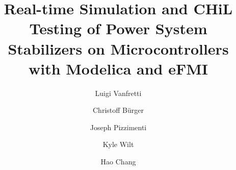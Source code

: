 \documentclass{modelica}
\begin{document}
\thispagestyle{empty}

\title{Real-time Simulation and CHiL Testing of Power System Stabilizers on Microcontrollers with Modelica and eFMI}
\author[1]{Luigi Vanfretti}
\author[2]{Christoff Bürger}
\author[1]{Joseph Pizzimenti}
\author[1]{Kyle Wilt}
\author[1]{Hao Chang}

\maketitle\thispagestyle{empty} %

\newcommand{\myitemsep}{\itemsep-0.1em}
\newcommand{\regtm}{\textsuperscript{\textregistered}}
\newcommand{\controller}{\textcolor{mygreen}{\textbf{\underline{controller}}}}
\newcommand{\plant}{\textcolor{myblue}{\textbf{\underline{plant}}}}
\newcommand{\generatorunit}{\textcolor{mygray}{\textbf{\underline{generator unit}}}}
\newcommand{\squishlist}{
 \begin{list}{$\bullet$}
  { \setlength{\itemsep}{0pt}
     \setlength{\parsep}{3pt}
     \setlength{\topsep}{3pt}
     \setlength{\partopsep}{0pt}
     \setlength{\leftmargin}{1.5em}
     \setlength{\labelwidth}{1em}
     \setlength{\labelsep}{0.5em} } }
\newcommand{\squishlisttwo}{
 \begin{list}{$\bullet$}
  { \setlength{\itemsep}{0pt}
    \setlength{\parsep}{0pt}
    \setlength{	opsep}{0pt}
    \setlength{\partopsep}{0pt}
    \setlength{\leftmargin}{2em}
    \setlength{\labelwidth}{1.5em}
    \setlength{\labelsep}{0.5em} } }
\newcommand{\squishend}{
  \end{list}  }
\end{document}

